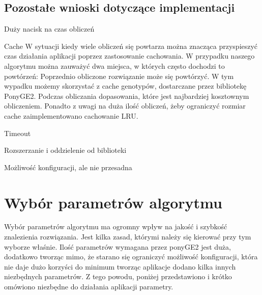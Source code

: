 \subsection{Pozostałe wnioski dotyczące implementacji}
Duży nacisk na czas obliczeń

Cache
W sytuacji kiedy wiele obliczeń się powtarza można znacząca przyspieszyć czas działania aplikacji poprzez zastosowanie cachowania. W przypadku naszego algorytmu można zauważyć dwa miejsca, w których często dochodzi to powtórzeń:
Poprzednio obliczone rozwiązanie może się powtórzyć. W tym wypadku możemy skorzystać z cache genotypów, dostarczane przez bibliotekę PonyGE2.
Podczas obliczania dopasowania, które jest najbardziej kosztownym obliczeniem. Ponadto z uwagi na duża ilość obliczeń, żeby ograniczyć rozmiar cache zaimplementowano cachowanie LRU.

Timeout

Rozszerzanie i oddzielenie od biblioteki

Możliwość konfiguracji, ale nie przesadna

\section{Wybór parametrów algorytmu}
Wybór parametrów algorytmu ma ogromny wpływ na jakość i szybkość znalezienia rozwiązania. Jest kilka zasad, którymi należy się kierować przy tym wyborze właśnie. Ilość parametrów wymagana przez ponyGE2 jest duża, dodatkowo tworząc mimo, że starano się ograniczyć możliwość konfiguracji, która nie daje dużo korzyści do minimum tworząc aplikacje dodano kilka innych niezbędnych parametrów. Z tego powodu, poniżej przedstawiono i krótko omówiono niezbędne do działania aplikacji parametry.

